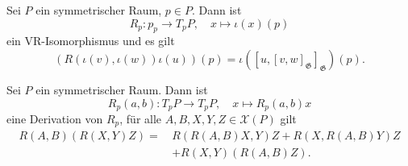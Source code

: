 \documentclass{cheat-sheet}
\newcommand{\Gie}{\mathfrak{G}} %
\newcommand{\VF}{\mathcal{X}} %
\begin{document}
\begin{prop}
  Sei $P$ ein symmetrischer Raum, $p \in P$. Dann ist
  \[
    R_p : p_p \to T_p P, \quad
    x \mapsto \iota(x)(p)
  \]
  ein VR-Isomorphismus und es gilt
  \[ (R(\iota(v), \iota(w)) \iota(u))(p) = \iota([u, [v, w]_\Gie]_\Gie)(p). \]
\end{prop}

\begin{kor}
  Sei $P$ ein symmetrischer Raum. Dann ist
  \[
    R_p(a, b) : T_p P \to T_p P, \quad
    x \mapsto R_p(a, b) x
  \]
  eine Derivation von $R_p$, \dh{} für alle $A, B, X, Y, Z \in \VF(P)$ gilt
  \begin{align*}
    R(A, B)(R(X, Y)Z) = \, & R(R(A, B)X, Y)Z + R(X, R(A, B)Y)Z \\
    & + R(X, Y)(R(A, B)Z).
  \end{align*}
\end{kor}

\end{document}
